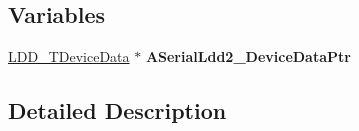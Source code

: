 \subsection*{Variables}
\begin{DoxyCompactItemize}
\item 
\mbox{\label{group___u_a_r_t2__module_gadee68051b76891befdaf56e3da755391}} 
\hyperlink{group___p_e___types__module_gac5cf1362f1f0e3a2ce71b1bf2276d091}{L\+D\+D\+\_\+\+T\+Device\+Data} $\ast$ {\bfseries A\+Serial\+Ldd2\+\_\+\+Device\+Data\+Ptr}
\end{DoxyCompactItemize}


\subsection{Detailed Description}
